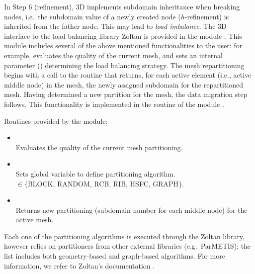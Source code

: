 In Step 6 (refinement), \hp3D implements subdomain inheritance when breaking nodes, i.e.~the subdomain value  of a newly created node ($h$-refinement) is inherited from the father node. This may lead to \emph{load imbalance}. The \hp3D interface to the load balancing library Zoltan is provided in the module . This module includes several of the above mentioned functionalities to the user: for example,  evaluates the quality of the current mesh, and  sets an internal parameter () determining the load balancing strategy. The mesh repartitioning begins with a call to the routine  that returns, for each active element (i.e., active middle node) in the mesh, the newly assigned subdomain for the repartitioned mesh. Having determined a new partition for the mesh, the data migration step follows. This functionality is implemented in the  routine of the module . 

Routines provided by the  module:
\begin{itemize}
	\itemsep 0pt
	\item{ \\
		Evaluates the quality of the current mesh partitioning.
	}
	\item{ \\
		Sets global variable  to define partitioning algorithm.\\
		 $\in \{$BLOCK, RANDOM, RCB, RIB, HSFC, GRAPH$\}$.
	}
	\item{ \\
		Returns new partitioning (subdomain number for each middle node) for the active mesh.
	}
\end{itemize}

Each one of the partitioning algorithms is executed through the Zoltan library, however relies on partitioners from other external libraries (e.g.~ParMETIS); the list includes both geometry-based and graph-based algorithms. For more information, we refer to Zoltan's documentation \cite{ZoltanOverviewArticle2002}.

